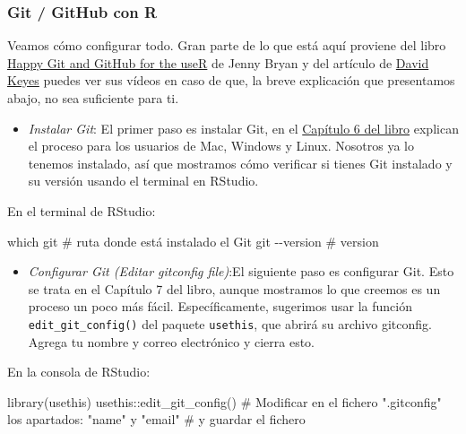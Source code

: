 \documentclass[
  letterpaper,
  DIV=11,
  numbers=noendperiod]{scrreprt}
\newenvironment{Shaded}{\begin{snugshade}}{\end{snugshade}}
\newcommand{\CommentTok}[1]{\textcolor[rgb]{0.37,0.37,0.37}{#1}}
\newcommand{\FunctionTok}[1]{\textcolor[rgb]{0.28,0.35,0.67}{#1}}
\newcommand{\NormalTok}[1]{\textcolor[rgb]{0.00,0.23,0.31}{#1}}
\newcommand{\SpecialCharTok}[1]{\textcolor[rgb]{0.37,0.37,0.37}{#1}}
\providecommand{\tightlist}{%
  \setlength{\itemsep}{0pt}\setlength{\parskip}{0pt}}\usepackage{longtable,booktabs,array}
\begin{document}
\hypertarget{git-github-con-r}{%
\subsubsection{Git / GitHub con R}\label{git-github-con-r}}

Veamos cómo configurar todo. Gran parte de lo que está aquí proviene del
libro \href{https://happygitwithr.com/}{Happy Git and GitHub for the
useR} de Jenny Bryan y del artículo de
\href{https://rfortherestofus.com/2021/02/how-to-use-git-github-with-r/}{David
Keyes} puedes ver sus vídeos en caso de que, la breve explicación que
presentamos abajo, no sea suficiente para ti.

\begin{itemize}
\tightlist
\item
  {\emph{Instalar Git}}: El primer paso es instalar Git, en el
  \href{https://happygitwithr.com/install-git}{Capítulo 6 del libro}
  explican el proceso para los usuarios de Mac, Windows y Linux.
  Nosotros ya lo tenemos instalado, así que mostramos cómo verificar si
  tienes Git instalado y su versión usando el terminal en RStudio.
\end{itemize}

En el terminal de RStudio:

\begin{Shaded}
\begin{Highlighting}[]
\NormalTok{which git }\CommentTok{\# ruta donde está instalado el Git}
\NormalTok{git }\SpecialCharTok{{-}{-}}\NormalTok{version }\CommentTok{\# version}
\end{Highlighting}
\end{Shaded}

\begin{itemize}
\tightlist
\item
  {\emph{Configurar Git (Editar gitconfig file)}}:El siguiente paso es
  configurar Git. Esto se trata en el Capítulo 7 del libro, aunque
  mostramos lo que creemos es un proceso un poco más fácil.
  Específicamente, sugerimos usar la función
  \texttt{edit\_git\_config()} del paquete \texttt{usethis}, que abrirá
  su archivo gitconfig. Agrega tu nombre y correo electrónico y cierra
  esto.
\end{itemize}

En la consola de RStudio:

\begin{Shaded}
\begin{Highlighting}[]
\FunctionTok{library}\NormalTok{(usethis)}
\NormalTok{usethis}\SpecialCharTok{::}\FunctionTok{edit\_git\_config}\NormalTok{()}
\CommentTok{\# Modificar en el fichero ".gitconfig" los apartados: "name" y "email" }
\CommentTok{\# y guardar el fichero}
\end{Highlighting}
\end{Shaded}
\end{document}

